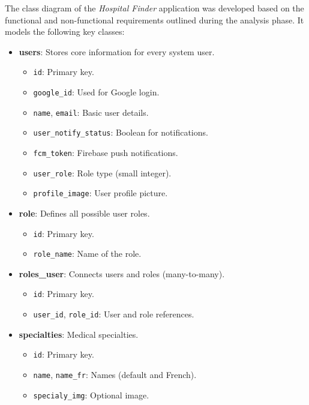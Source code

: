 \documentclass[12pt]{report}
\begin{document}
The class diagram of the \textit{Hospital Finder} application was developed based on the functional and non-functional requirements outlined during the analysis phase. It models the following key classes:
\begin{itemize}

	\item \textbf{users}: Stores core information for every system user.
	      \begin{itemize}
		      \item \texttt{id}: Primary key.
		      \item \texttt{google\_id}: Used for Google login.
		      \item \texttt{name}, \texttt{email}: Basic user details.
		      \item \texttt{user\_notify\_status}: Boolean for notifications.
		      \item \texttt{fcm\_token}: Firebase push notifications.
		      \item \texttt{user\_role}: Role type (small integer).
		      \item \texttt{profile\_image}: User profile picture.
	      \end{itemize}

	\item \textbf{role}: Defines all possible user roles.
	      \begin{itemize}
		      \item \texttt{id}: Primary key.
		      \item \texttt{role\_name}: Name of the role.
	      \end{itemize}

	\item \textbf{roles\_user}: Connects users and roles (many-to-many).
	      \begin{itemize}
		      \item \texttt{id}: Primary key.
		      \item \texttt{user\_id}, \texttt{role\_id}: User and role references.
	      \end{itemize}

	\item \textbf{specialties}: Medical specialties.
	      \begin{itemize}
		      \item \texttt{id}: Primary key.
		      \item \texttt{name}, \texttt{name\_fr}: Names (default and French).
		      \item \texttt{specialy\_img}: Optional image.
	      \end{itemize}


\end{itemize}
\end{document}
